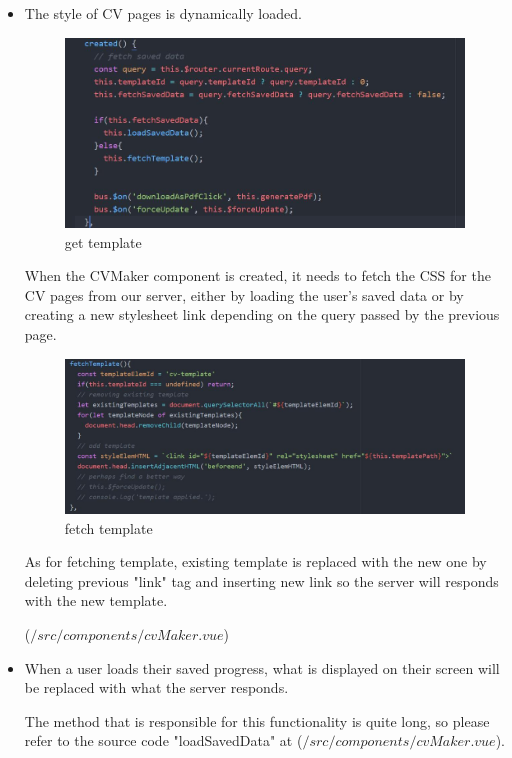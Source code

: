 \documentclass[11pt]{article}
\begin{document}
\begin{spacing}{1.0}
\begin{itemize}
	\item The style of CV pages is dynamically loaded.
				\begin{figure}[H]
	\centering
	\includegraphics[scale=0.5]{figures/dp/cvMakerCreated.jpg}
	\caption{get template}
\end{figure}	
	
	When the CVMaker component is created, it needs to fetch the CSS for the CV pages from our server, either by loading the user's saved data or by creating a new stylesheet link depending on the query passed by the previous page. 
	
	\begin{figure}[H]
	\centering
	\includegraphics[scale=0.5]{figures/dp/fetchTemplate.jpg}
	\caption{fetch template}
\end{figure}	
	
	As for fetching template, existing template is replaced with the new one by deleting previous "link" tag and inserting new link so the server will responds with the new template.
	
		($/src/components/cvMaker.vue$)	
	
	\item When a user loads their saved progress, what is displayed on their screen will be replaced with what the server responds.
	
	The method that is responsible for this functionality is quite long, so please refer to the source code "loadSavedData" at
	($/src/components/cvMaker.vue$).
	

\end{itemize}
\end{spacing}
\end{document}
